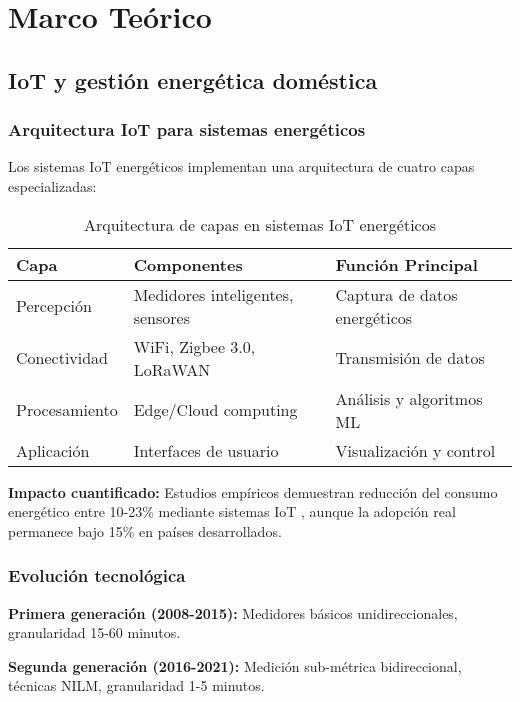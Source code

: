 \chapter{Marco Teórico}
\label{ch:marco_teorico}

\section{IoT y gestión energética doméstica}

\subsection{Arquitectura IoT para sistemas energéticos}

Los sistemas IoT energéticos implementan una arquitectura de cuatro capas especializadas:

\begin{table}[H]
\centering
\caption{Arquitectura de capas en sistemas IoT energéticos}
\begin{tabular}{|l|l|l|}
\hline
\textbf{Capa} & \textbf{Componentes} & \textbf{Función Principal} \\
\hline
Percepción & Medidores inteligentes, sensores & Captura de datos energéticos \\
\hline
Conectividad & WiFi, Zigbee 3.0, LoRaWAN & Transmisión de datos \\
\hline
Procesamiento & Edge/Cloud computing & Análisis y algoritmos ML \\
\hline
Aplicación & Interfaces de usuario & Visualización y control \\
\hline
\end{tabular}
\label{tab:arquitectura_iot}
\end{table}

\textbf{Impacto cuantificado:} Estudios empíricos demuestran reducción del consumo energético entre 10-23\% mediante sistemas IoT \cite{iea2022digitalization}, aunque la adopción real permanece bajo 15\% en países desarrollados.

\subsection{Evolución tecnológica}

\textbf{Primera generación (2008-2015):} Medidores básicos unidireccionales, granularidad 15-60 minutos.

\textbf{Segunda generación (2016-2021):} Medición sub-métrica bidireccional, técnicas NILM, granularidad 1-5 minutos.

